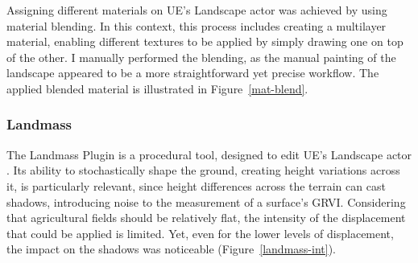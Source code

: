 Assigning different materials on UE’s Landscape actor was achieved by using material blending. In this context, this process includes creating a multilayer material, enabling different textures to be applied by simply drawing one on top of the other. I manually performed the blending, as the manual painting of the landscape appeared to be a more straightforward yet precise workflow. The applied blended material is illustrated in Figure~\ref{mat-blend}.


\subsubsection{Landmass}

The Landmass Plugin is a procedural tool, designed to edit UE’s Landscape actor \cite{epic_landmass_building_worlds}. Its ability to stochastically shape the ground, creating height variations across it, is particularly relevant, since height differences across the terrain can cast shadows, introducing noise to the measurement of a surface's GRVI. Considering that agricultural fields should be relatively flat, the intensity of the displacement that could be applied is limited. Yet, even for the lower levels of displacement, the impact on the shadows was noticeable (Figure~\ref{landmass-int}).

